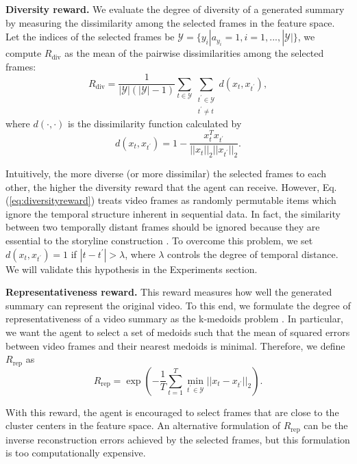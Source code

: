 \documentclass[letterpaper]{article} \usepackage{aaai18}  \usepackage{times}  \usepackage{helvet}  \usepackage{courier}  \usepackage{url}  \usepackage{graphicx}
\begin{document}
{\bf Diversity reward.} We evaluate the degree of diversity of a generated summary by measuring the dissimilarity among the selected frames in the feature space. Let the indices of the selected frames be $\mathcal{Y} = \{ y_i | a_{y_i} = 1, i = 1, ..., |\mathcal{Y}| \}$, we compute $R_\text{div}$ as the mean of the pairwise dissimilarities among the selected frames:
\begin{equation} \label{eq:diversityreward}
R_\text{div} = \frac{1}{|\mathcal{Y}| (|\mathcal{Y}| - 1)} \sum_{t \in \mathcal{Y}} \sum_{\substack{t^\prime \in \mathcal{Y} \\ t^\prime \neq t}} d (x_t, x_{t^\prime}),
\end{equation}
where $d(\cdot, \cdot)$ is the dissimilarity function calculated by
\begin{equation}
d (x_t, x_{t^\prime}) = 1 - \frac{x_t^T x_{t^\prime}}{||x_t||_2 ||x_{t^\prime}||_2}.
\end{equation}

Intuitively, the more diverse (or more dissimilar) the selected frames to each other, the higher the diversity reward that the agent can receive. However, Eq.\,(\ref{eq:diversityreward}) treats video frames as randomly permutable items which ignore the temporal structure inherent in sequential data. In fact, the similarity between two temporally distant frames should be ignored because they are essential to the storyline construction \cite{gong2014diverse}. To overcome this problem, we set $d (x_t, x_{t^\prime}) = 1$ if $|t -t^\prime| > \lambda$, where $\lambda$ controls the degree of temporal distance. We will validate this hypothesis in the Experiments section.

{\bf Representativeness reward.} This reward measures how well the generated summary can represent the original video. To this end, we formulate the degree of representativeness of a video summary as the k-medoids problem \cite{gygli2015video}. In particular, we want the agent to select a set of medoids such that the mean of squared errors between video frames and their nearest medoids is minimal. Therefore, we define $R_\text{rep}$ as
\begin{equation}
R_\text{rep} = \exp (- \frac{1}{T} \sum_{t=1}^T \min_{t^\prime \in \mathcal{Y}} || x_t - x_{t^\prime} ||_2).
\end{equation}

With this reward, the agent is encouraged to select frames that are close to the cluster centers in the feature space. An alternative formulation of $R_\text{rep}$ can be the inverse reconstruction errors achieved by the selected frames, but this formulation is too computationally expensive.
\end{document}
